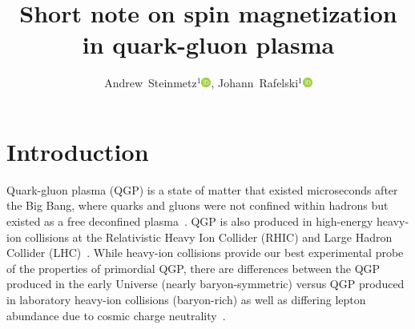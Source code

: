 \documentclass[epjST]{svjour}
\newcommand{\orcidicon}{\includegraphics[width=0.32cm]{orcid.pdf}}
\newcommand{\orc}[1]{\href{https://orcid.org/#1}{\orcidicon}}
\newcommand{\orcJR}{0000-0001-8217-1484}
\newcommand{\orcAJS}{0000-0001-5474-2649}
\numberwithin{equation}{section}
\begin{document}
\title{Short note on spin magnetization in quark-gluon plasma
    }

\author{
    Andrew~Steinmetz${}^1$\orc{\orcAJS},
    Johann~Rafelski${}^1$\orc{\orcJR}
    }



\maketitle

\section{Introduction}
\label{sec:introduction}
Quark-gluon plasma (QGP) is a state of matter that existed microseconds after the Big Bang, where quarks and gluons were not confined within hadrons but existed as a free deconfined plasma~\cite{Letessier:2002ony,Rafelski:2015cxa,Rafelski:2023emw,Rafelski:2024fej,Shuryak:2004cy,HotQCD:2014kol}. QGP is also produced in high-energy heavy-ion collisions at the Relativistic Heavy Ion Collider (RHIC) and Large Hadron Collider (LHC)~\cite{Rafelski:1982pu,STAR:2005gfr,Palni:2024wdy,Mu:2025gtr}. While heavy-ion collisions provide our best experimental probe of the properties of primordial QGP, there are differences between the QGP produced in the early Universe (nearly baryon-symmetric) versus QGP produced in laboratory heavy-ion collisions (baryon-rich) as well as differing lepton abundance due to cosmic charge neutrality~\cite{Yang:2024ret}.
\end{document}
